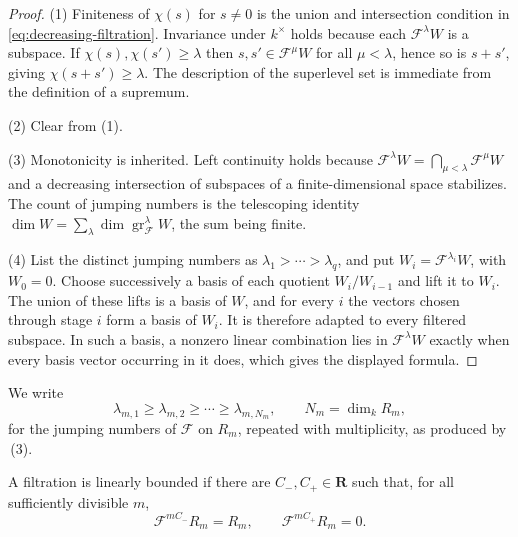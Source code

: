 \begin{proof}
(1)  Finiteness of $\chi(s)$ for $s\ne0$ is the union and intersection
condition in \eqref{eq:decreasing-filtration}.  Invariance under
$k^\times$ holds because each $\mathcal F^\lambda W$ is a subspace.  If
$\chi(s),\chi(s')\geq\lambda$ then $s,s'\in\mathcal F^\mu W$ for all
$\mu<\lambda$, hence so is $s+s'$, giving $\chi(s+s')\geq\lambda$.
The description of the superlevel set is immediate from the definition of a
supremum.

(2)  Clear from (1).

(3)  Monotonicity is inherited.  Left continuity holds because
$\mathcal F^\lambda W=\bigcap_{\mu<\lambda}\mathcal F^\mu W$ and a
decreasing intersection of subspaces of a finite-dimensional space
stabilizes.  The count of jumping numbers is the telescoping identity
$\dim W=\sum_\lambda\dim\operatorname{gr}^\lambda_{\mathcal F}W$, the sum being finite.

(4)  List the distinct jumping numbers as
$\lambda_1>\cdots>\lambda_q$, and put
$W_i=\mathcal F^{\lambda_i}W$, with $W_0=0$.  Choose successively a
basis of each quotient $W_i/W_{i-1}$ and lift it to $W_i$.  The union
of these lifts is a basis of $W$, and for every $i$ the vectors chosen
through stage $i$ form a basis of $W_i$.  It is therefore adapted to
every filtered subspace.  In such a basis, a nonzero linear combination
lies in $\mathcal F^\lambda W$ exactly when every basis vector occurring
in it does, which gives the displayed formula.
\end{proof}

We write
\begin{equation}
\label{eq:ch33-jumping-list}
 \lambda_{m,1}\geq\lambda_{m,2}\geq\cdots\geq\lambda_{m,N_m},
 \qquad N_m=\dim_kR_m ,
\end{equation}
for the jumping numbers of $\mathcal F$ on $R_m$, repeated with
multiplicity, as produced by
\,(3).

\begin{definition}
\label{def:linearly-bounded-filtration}
A filtration is linearly bounded if there are $C_-,C_+\in\mathbf R$ such
that, for all sufficiently divisible $m$,
\begin{equation}
\label{eq:linear-bounds-filtration}
 \mathcal F^{mC_-}R_m=R_m,\qquad
 \mathcal F^{mC_+}R_m=0.
\end{equation}
\end{definition}


